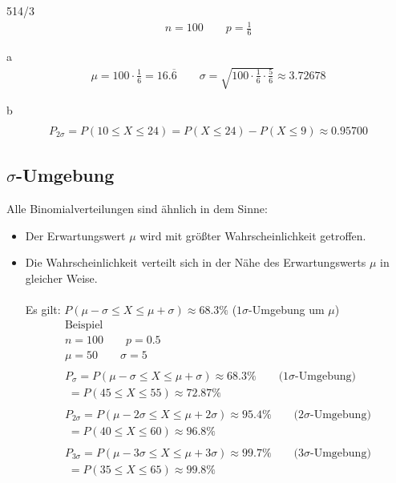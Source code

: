 \begin{exercise}{514/3}
  \begin{gather*}
    n = 100 \qquad p = \frac{1}{6}
  \end{gather*}
  \item [a]
  \begin{gather*}
    \mu = 100 \cdot \frac{1}{6} = 16.\overline{6} \qquad \sigma = \sqrt{100 \cdot \frac{1}{6} \cdot \frac{5}{6}} \approx 3.72678
  \end{gather*}
  \item [b]
  \begin{gather*}
    [10; 24] \\
    P_{2\sigma} = P(10 \leq X \leq 24) = P(X \leq 24) - P(X \leq 9) \approx 0.95700
  \end{gather*}
\end{exercise}
\subsection{\texorpdfstring{$\sigma$}{Sigma}-Umgebung}
Alle Binomialverteilungen sind ähnlich in dem Sinne:
\begin{itemize}
  \item Der Erwartungswert $\mu$ wird mit größter Wahrscheinlichkeit getroffen.
  \item Die Wahrscheinlichkeit verteilt sich in der Nähe des Erwartungswerts $\mu$ in gleicher Weise. \\\\
  Es gilt: $P(\mu - \sigma \leq X \leq \mu + \sigma) \approx 68.3\%$ \qquad ($1\sigma$-Umgebung um $\mu$)
  \begin{gather*}
    \text{Beispiel} \\
    n = 100 \qquad p = 0.5 \\
    \mu = 50 \qquad \sigma = 5 \\\\
    P_\sigma = P(\mu - \sigma \leq X \leq \mu + \sigma) \approx 68.3\% \qquad \text{($1\sigma$-Umgebung)} \\
    \;= P(45 \leq X \leq 55) \approx 72.87\% \\\\
    P_{2\sigma} = P(\mu - 2\sigma \leq X \leq \mu + 2\sigma) \approx 95.4\% \qquad \text{($2\sigma$-Umgebung)} \\
    \;= P(40 \leq X \leq 60) \approx 96.8\% \\\\
    P_{3\sigma} = P(\mu - 3\sigma \leq X \leq \mu + 3\sigma) \approx 99.7\% \qquad \text{($3\sigma$-Umgebung)} \\
    \;= P(35 \leq X \leq 65) \approx 99.8\%
  \end{gather*}
\end{itemize}
\newpage
